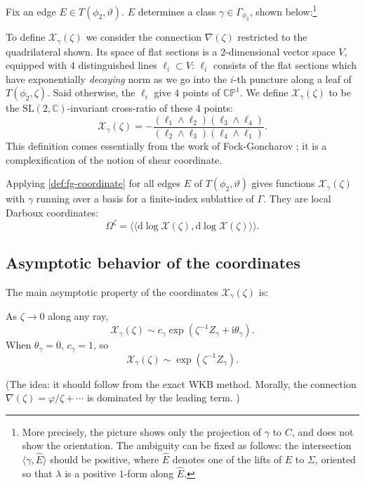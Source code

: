 \documentclass[12pt,letterpaper,reqno]{article}
\numberwithin{equation}{section}
\newcommand{\cX}{\ensuremath{\mathcal X}}
\newcommand{\C}{\ensuremath{\mathbb C}}
\newcommand{\PP}{\ensuremath{\mathbb P}}
\newcommand{\I}{{\mathrm i}}
\newcommand{\de}{\mathrm{d}}
\newcommand{\IP}[1]{\langle#1\rangle}
\newcommand{\DIP}[1]{\langle\!\langle#1\rangle\!\rangle}
\newcommand{\ti}[1]{\textit{#1}}
\newcommand{\SL}{\mathrm{SL}}
\newcommand{\insfig}[2]{

\medskip
\noindent
\begin{minipage}{\linewidth}

\makebox[\linewidth]{\texttt{[image: figures/\#1-crop.pdf]}}

\end{minipage}
\medskip

}
\newcommand{\fixme}[1]{{\color{orange}{[#1]}}}
\begin{document}
\begin{defn} \label{def:fg-coordinate}
Fix an edge $E \in T(\phi_2,\vartheta)$.
$E$ determines a class $\gamma \in \Gamma_{\phi_2}$, shown
below:\footnote{More precisely, the picture shows
only the projection of $\gamma$ to $C$, and does not show
the orientation. The ambiguity can be fixed as follows:
the intersection $\IP{\gamma,\hat E}$ should be positive,
where $\hat E$ denotes one of the lifts of $E$ to $\Sigma$,
oriented so that $\lambda$ is a positive $1$-form
along $\hat E$.}
\insfig{higgs-metric-10}{1.3}
To define $\cX_\gamma(\zeta)$ we consider the connection
$\nabla(\zeta)$ restricted to the quadrilateral shown.
Its space of flat sections is a $2$-dimensional vector space $V$,
equipped with $4$ distinguished lines $\ell_i \subset V$:
$\ell_i$ consists of the flat sections
which have exponentially \ti{decaying} norm 
as we go into the $i$-th 
puncture along a leaf of $T(\phi_2,\zeta)$.
Said otherwise, the $\ell_i$ give $4$ points of $\C\PP^1$.
We define $\cX_\gamma(\zeta)$ to be the
$\SL(2,\C)$-invariant cross-ratio of these $4$ points:
\begin{equation}
	\cX_\gamma(\zeta) = - \frac{(\ell_1 \wedge \ell_2)(\ell_3 \wedge \ell_4)}{(\ell_2 \wedge \ell_3) (\ell_4 \wedge \ell_1)} .
\end{equation}
This definition comes essentially from
the work of Fock-Goncharov \cite{MR2233852}; it is a complexification of the notion of shear coordinate.
\end{defn}

Applying \autoref{def:fg-coordinate} for all edges $E$
of $T(\phi_2,\vartheta)$ gives functions
$\cX_\gamma(\zeta)$ with $\gamma$ running over a basis for
a finite-index sublattice of $\Gamma$. They are local
Darboux coordinates:
\begin{equation}
  \Omega^\zeta = \DIP{\de \log \cX(\zeta), \de \log \cX(\zeta)}.
\end{equation}

\subsection{Asymptotic behavior of the coordinates}

The main asymptotic property of the coordinates $\cX_\gamma(\zeta)$ is:
\begin{conj}
As $\zeta \to 0$ along any ray,
\begin{equation}
  \cX_\gamma(\zeta) \sim c_\gamma \exp \left(\zeta^{-1} Z_\gamma + \I \theta_\gamma \right).
\end{equation}
When $\theta_\gamma = 0$, $c_\gamma = 1$, so
\begin{equation}
  \cX_\gamma(\zeta) \sim \exp \left(\zeta^{-1} Z_\gamma\right).
\end{equation}
\end{conj}
(The idea: it should follow from the exact WKB method. Morally,
the connection $\nabla(\zeta) = \varphi / \zeta + \cdots$ 
is dominated by the leading term. \fixme{explain a little more?})
\end{document}
